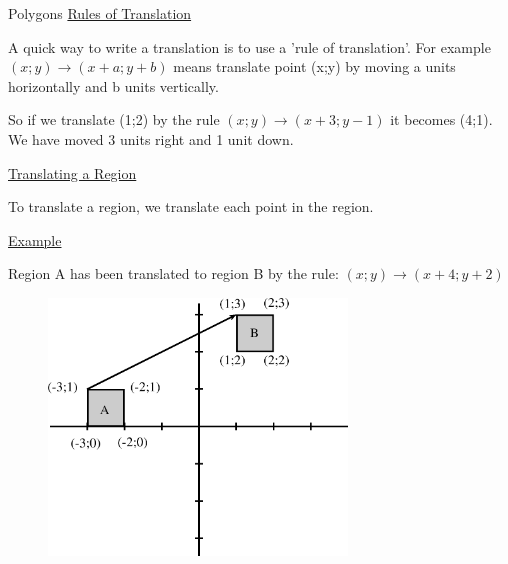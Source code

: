 \begin{exercises}{Polygons}
          \label{m39358*id72402}
            \uline{Rules of Translation}
          \par 
          \label{m39358*id72409}A quick way to write a translation is to use a 'rule of translation'. For example $\left(x;y\right)\to \left(x+a;y+b\right)$ means translate point (x;y) by moving a units horizontally and b units vertically.\par 
          \label{m39358*id72456}So if we translate (1;2) by the rule $\left(x;y\right)\to \left(x+3;y-1\right)$ it becomes (4;1). We have moved 3 units right and 1 unit down.\par 
          \label{m39358*id72503}
            \uline{Translating a Region}
          \par 
          \label{m39358*id72511}To translate a region, we translate each point in the region.\par 
          \label{m39358*id72517}
            \uline{Example}
          \par 
          \label{m39358*id72526}Region A has been translated to region B by the rule: $\left(x;y\right)\to \left(x+4;y+2\right)$\par 
          \label{m39358*id72572}
            
    \setcounter{subfigure}{0}


	\begin{figure}[H] %
    \begin{center}
    \label{m39358*id72575!!!underscore!!!media}\label{m39358*id72575!!!underscore!!!printimage}\includegraphics[width=300px]{col11306.imgs/m39358_MG10C14_031.png} %
        
      \vspace{2pt}
    \vspace{.1in}
    
    \end{center}


\end{figure}
\end{exercises}
